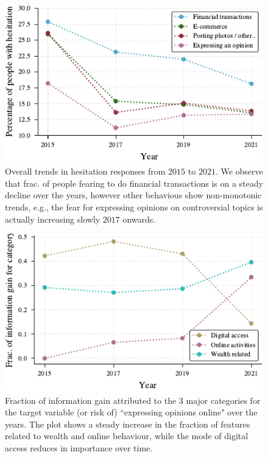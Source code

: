 \documentclass{article}
\theoremstyle{plain}
\theoremstyle{definition}
\theoremstyle{remark}
\begin{document}
\begin{figure}[h]
\includegraphics{tex/figures/activity_over_time.pdf}
\caption{Overall trends in hesitation responses from $2015$ to $2021$. We observe that frac. of people fearing to do financial transactions is on a steady decline over the years, however other behavious show non-monotonic trends, e.g., the fear for expressing opinions on controversial topics is actually increasing slowly $2017$ onwards.}
\label{fig:activity-over-time}
\end{figure}



\begin{figure}[h]
\includegraphics{tex/figures/categories_over_time.pdf}
\caption{Fraction of information gain attributed to the $3$ major categories for the target variable (or risk of) ``expressing opinions online" over the years. The plot shows a steady increase in the fraction of features related to wealth and online behaviour, while the mode of digital access reduces in importance over time.}
\label{fig:category_importance_over_time}
\vspace{-.3cm}
\end{figure}
\end{document}

